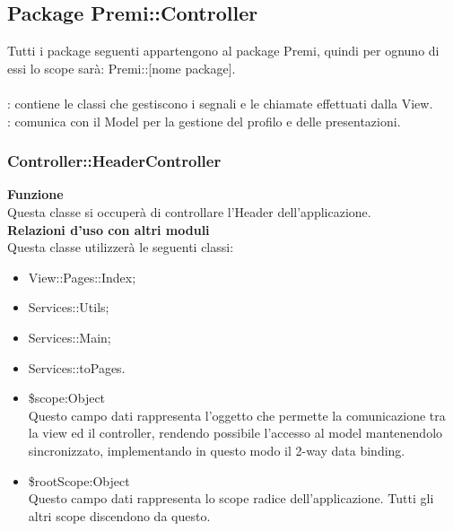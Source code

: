 \subsection{Package Premi::Controller}{
\label{sec:controller}
Tutti i package seguenti appartengono al package Premi, quindi per ognuno di essi lo scope sarà: Premi::[nome package].\\\\
\textbf{\tipo}: contiene le classi che gestiscono i segnali e le chiamate effettuati dalla View.\\
\textbf{\relaz}: comunica con il Model per la gestione del profilo e delle presentazioni.\\

\subsubsection{Controller::HeaderController}
	\label{sub:HeaderController}
	\textbf{Funzione}\\
	\indent Questa classe si occuperà di controllare l'Header dell'applicazione.\\
	\textbf{Relazioni d'uso con altri moduli}\\
	\indent Questa classe utilizzerà le seguenti classi:
	\begin{itemize}
		\item View::Pages::Index;
		\item Services::Utils;
		\item Services::Main;
		\item Services::toPages.
		\item \$scope:Object\\
			\indent Questo campo dati rappresenta l’oggetto che permette la comunicazione tra la view ed il controller, rendendo possibile l’accesso al model mantenendolo sincronizzato, implementando in questo modo il 2-way data binding.
		\item \$rootScope:Object\\
			\indent Questo campo dati rappresenta lo scope radice dell’applicazione. Tutti gli altri scope discendono da questo.
	\end{itemize}

}
